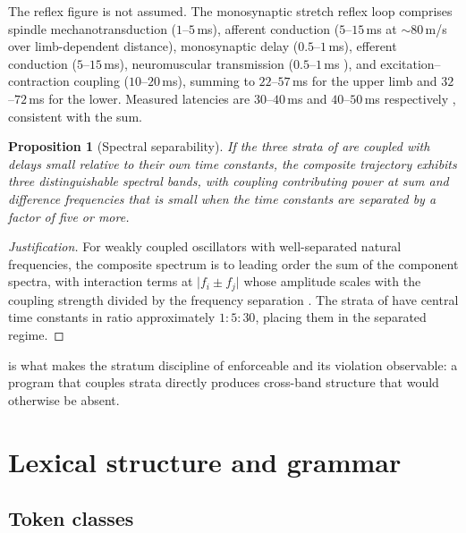 \documentclass[11pt,twocolumn,a4paper]{article}
\theoremstyle{thmstyle}
\newtheorem{proposition}[theorem]{Proposition}
\theoremstyle{definition}
\theoremstyle{remark}
\newcommand{\abs}[1]{\lvert#1\rvert}
\begin{document}
The reflex figure is not assumed. The monosynaptic stretch reflex loop
comprises spindle mechanotransduction ($1$--$5$\,ms), afferent conduction
($5$--$15$\,ms at $\sim\!80$\,m/s over limb-dependent distance), monosynaptic
delay ($0.5$--$1$\,ms), efferent conduction ($5$--$15$\,ms), neuromuscular
transmission ($0.5$--$1$\,ms \citep{katz1967,ruff2011}), and
excitation--contraction coupling ($10$--$20$\,ms), summing to $22$--$57$\,ms
for the upper limb and $32$--$72$\,ms for the lower. Measured latencies are
$30$--$40$\,ms and $40$--$50$\,ms respectively \citep{matthews1990},
consistent with the sum.

\begin{proposition}[Spectral separability]
\label{prop:separable}
If the three strata of  are coupled with delays small
relative to their own time constants, the composite trajectory exhibits three
distinguishable spectral bands, with coupling contributing power at sum and
difference frequencies that is small when the time constants are separated by
a factor of five or more.
\end{proposition}

\begin{proof}[Justification]
For weakly coupled oscillators with well-separated natural frequencies, the
composite spectrum is to leading order the sum of the component spectra, with
interaction terms at $\abs{f_i\pm f_j}$ whose amplitude scales with the
coupling strength divided by the frequency separation
\citep{kuramoto1984,strogatz2015}. The strata of  have
central time constants in ratio approximately $1:5:30$, placing them in the
separated regime.
\end{proof}

 is what makes the stratum discipline of
 enforceable and its violation observable: a program that
couples strata directly produces cross-band structure that would otherwise be
absent.

\section{Lexical structure and grammar}
\label{sec:grammar}

\subsection{Token classes}
\end{document}
